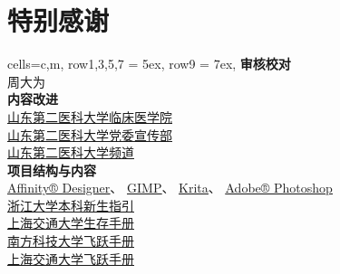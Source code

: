 \chapter*{特别感谢}
\begin{table}[H]
    \centering
    \begin{tblr}[
            tall,
            theme = {no-caption},
            note{1} = {除《武工大计院新生入学建议》外，文中列出的参考指南均已获得使用许可。},
        ]{
            cells={c,m},
            row{1,3,5,7} = {5ex},
            row{9} = {7ex},
        }
        {\large\textbf{审核校对}}                                                                      \\
        {周大为}                                                                                       \\
        {\large\textbf{内容改进}}                                                                      \\
        {
        \uline{\href{https://xchb.sdsmu.edu.cn}{山东第二医科大学临床医学院}}                           \\
        \uline{\href{https://xchb.sdsmu.edu.cn}{山东第二医科大学党委宣传部}}                           \\
        \uline{\href{https://pd.qq.com/s/7mekdr5ve}{山东第二医科大学频道}}
        }                                                                                              \\
        {\large\textbf{项目结构与内容}}                                                    \\
        {
        \uline{\href{https://affinity.serif.com/zh-cn/designer}{Affinity® Designer}}、%
        \uline{\href{https://www.gimp.org/}{GIMP}}、%
        \uline{\href{https://krita.org/zh-cn}{Krita}}、%
        \uline{\href{https://www.adobe.com/cn/creativecloud/roc/business.html}{Adobe® Photoshop}}      \\
        \uline{\href{https://zjuers.com/welcome}{浙江大学本科新生指引}}                                \\
        \uline{\href{https://github.com/SurviveSJTU/SurviveSJTUManual}{上海交通大学生存手册}}          \\
        \uline{\href{https://github.com/SUSTech-Application/SUSTechapplication}{南方科技大学飞跃手册}} \\
        \uline{\href{https://github.com/SurviveSJTU/SJTU-Application}{上海交通大学飞跃手册}}           \\
}
\end{tblr}
\end{table}
